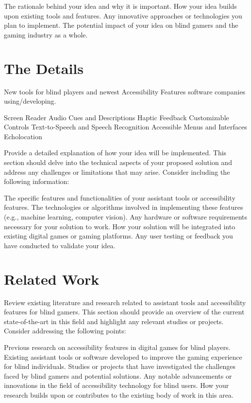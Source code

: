 \documentclass[sigconf,natbib=false,10pt]{acmart}
\begin{document}
	The rationale behind your idea and why it is important.
	How your idea builds upon existing tools and features.
	Any innovative approaches or technologies you plan to implement.
	The potential impact of your idea on blind gamers and the gaming industry as a whole.
	
	\section{The Details}
	New tools for blind players and newest Accessibility Features software companies using/developing.
	
	Screen Reader
	Audio Cues and Descriptions
	Haptic Feedback
	Customizable Controls
	Text-to-Speech and Speech Recognition
	Accessible Menus and Interfaces
	Echolocation
	
	Provide a detailed explanation of how your idea will be implemented. This section should delve into the technical aspects of your proposed solution and address any challenges or limitations that may arise. Consider including the following information:
	
	The specific features and functionalities of your assistant tools or accessibility features.
	The technologies or algorithms involved in implementing these features (e.g., machine learning, computer vision).
	Any hardware or software requirements necessary for your solution to work.
	How your solution will be integrated into existing digital games or gaming platforms.
	Any user testing or feedback you have conducted to validate your idea.
	
	\section{Related Work}
	Review existing literature and research related to assistant tools and accessibility features for blind gamers. This section should provide an overview of the current state-of-the-art in this field and highlight any relevant studies or projects. Consider addressing the following points:
	
	Previous research on accessibility features in digital games for blind players.
	Existing assistant tools or software developed to improve the gaming experience for blind individuals.
	Studies or projects that have investigated the challenges faced by blind gamers and potential solutions.
	Any notable advancements or innovations in the field of accessibility technology for blind users.
	How your research builds upon or contributes to the existing body of work in this area.
	
\end{document}
